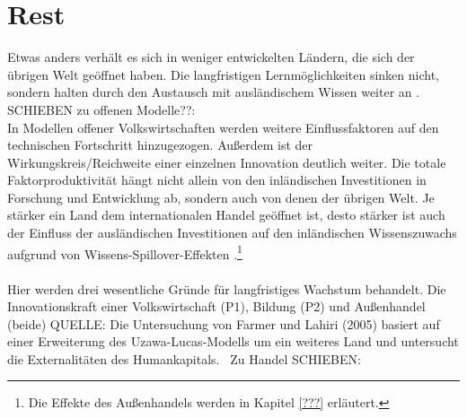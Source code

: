 \chapter{Rest}
%
Etwas anders verh{\"a}lt es sich in weniger entwickelten L{\"a}ndern, die sich der {\"u}brigen Welt ge{\"o}ffnet haben. Die langfristigen Lernm{\"o}glichkeiten sinken nicht, sondern halten durch den Austausch mit ausl{\"a}ndischem Wissen weiter an \cite{Arnold.1997}.
%
\textcolor[rgb]{0.2,0.8,0.2}{SCHIEBEN zu offenen Modelle??:\\
In Modellen offener Volkswirtschaften werden weitere Einflussfaktoren auf den technischen Fortschritt hinzugezogen. Au{\ss}erdem ist der \textcolor[rgb]{1,0,0}{Wirkungskreis/Reichweite} einer einzelnen Innovation deutlich weiter. Die totale Faktorproduktivit{\"a}t h{\"a}ngt nicht allein von den inl{\"a}ndischen Investitionen in Forschung und Entwicklung ab, sondern auch von denen der {\"u}brigen Welt.  Je st{\"a}rker ein Land dem internationalen Handel ge{\"o}ffnet ist, desto st{\"a}rker ist auch der Einfluss der ausl{\"a}ndischen Investitionen auf den inl{\"a}ndischen Wissenszuwachs aufgrund von Wissens-Spillover-Effekten \cite{Coe.1995}.\footnote{Die Effekte des Außenhandels werden in Kapitel \ref{???} erläutert.}\\}\\
Hier werden drei wesentliche Gründe für langfristiges Wachstum behandelt. Die Innovationskraft einer Volkswirtschaft (P1), Bildung (P2) und Außenhandel (beide)
%
\textcolor[rgb]{0.2,0.8,0.2}{
QUELLE: Die Untersuchung von Farmer und Lahiri (2005) basiert auf einer Erweiterung des Uzawa-Lucas-Modells um ein weiteres Land und untersucht die Externalit{\"a}ten des Humankapitals.~\cite{FarmerRogerE.A..2005}}
%
Zu Handel SCHIEBEN:
